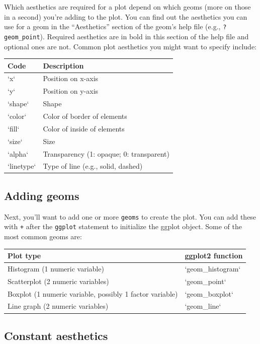 \documentclass[]{book}
\theoremstyle{definition}
\theoremstyle{definition}
\theoremstyle{definition}
\theoremstyle{remark}
\begin{document}
Which aesthetics are required for a plot depend on which geoms (more on
those in a second) you're adding to the plot. You can find out the
aesthetics you can use for a geom in the ``Aesthetics'' section of the
geom's help file (e.g., \texttt{?geom\_point}). Required aesthetics are
in bold in this section of the help file and optional ones are not.
Common plot aesthetics you might want to specify include:

\begin{tabular}{l|l}
\hline
Code & Description\\
\hline
`x` & Position on x-axis\\
\hline
`y` & Position on y-axis\\
\hline
`shape` & Shape\\
\hline
`color` & Color of border of elements\\
\hline
`fill` & Color of inside of elements\\
\hline
`size` & Size\\
\hline
`alpha` & Transparency (1: opaque; 0: transparent)\\
\hline
`linetype` & Type of line (e.g., solid, dashed)\\
\hline
\end{tabular}

\subsection{Adding geoms}\label{adding-geoms}

Next, you'll want to add one or more \texttt{geoms} to create the plot.
You can add these with \texttt{+} after the \texttt{ggplot} statement to
initialize the ggplot object. Some of the most common geoms are:

\begin{tabular}{l|l}
\hline
Plot type & ggplot2 function\\
\hline
Histogram (1 numeric variable) & `geom\_histogram`\\
\hline
Scatterplot (2 numeric variables) & `geom\_point`\\
\hline
Boxplot (1 numeric variable, possibly 1 factor variable) & `geom\_boxplot`\\
\hline
Line graph (2 numeric variables) & `geom\_line`\\
\hline
\end{tabular}

\subsection{Constant aesthetics}\label{constant-aesthetics}
\end{document}

